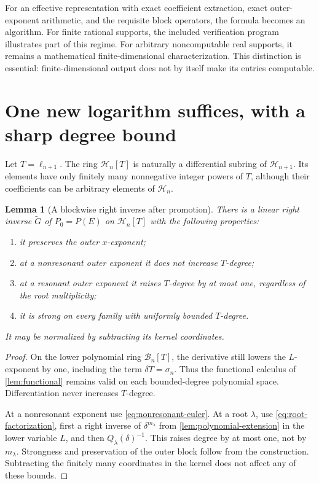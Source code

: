 \documentclass[11pt,a4paper]{article}
\numberwithin{equation}{section}
\newtheorem{lemma}[lemma]{Lemma}
\theoremstyle{definition}
\theoremstyle{remark}
\newcommand{\HH}{\mathcal H}
\begin{document}
For an effective representation with exact coefficient extraction, exact outer-exponent arithmetic, and the requisite block operators, the formula becomes an algorithm. For finite rational supports, the included verification program illustrates part of this regime. For arbitrary noncomputable real supports, it remains a mathematical finite-dimensional characterization. This distinction is essential: finite-dimensional output does not by itself make its entries computable.

\section{One new logarithm suffices, with a sharp degree bound}
\label{sec:promotion}
Let $T=\ell_{n+1}$. The ring $\HH_n[T]$ is naturally a differential subring of $\HH_{n+1}$. Its elements have only finitely many nonnegative integer powers of $T$, although their coefficients can be arbitrary elements of $\HH_n$.

\begin{lemma}[A blockwise right inverse after promotion]
\label{lem:promoted-inverse}
There is a linear right inverse $\widetilde G$ of $P_0=P(E)$ on $\HH_n[T]$ with the following properties:
\begin{enumerate}[label=(\alph*),leftmargin=2em,itemsep=2pt]
\item it preserves the outer $x$-exponent;
\item at a nonresonant outer exponent it does not increase $T$-degree;
\item at a resonant outer exponent it raises $T$-degree by at most one, regardless of the root multiplicity;
\item it is strong on every family with uniformly bounded $T$-degree.
\end{enumerate}
It may be normalized by subtracting its kernel coordinates.
\end{lemma}
\begin{proof}
On the lower polynomial ring $\mathcal B_n[T]$, the derivative still lowers the $L$-exponent by one, including the term $\delta T=\sigma_n$. Thus the functional calculus of \cref{lem:functional} remains valid on each bounded-degree polynomial space. Differentiation never increases $T$-degree.

At a nonresonant exponent use \eqref{eq:nonresonant-euler}. At a root $\lambda$, use \eqref{eq:root-factorization}, first a right inverse of $\delta^{m_\lambda}$ from \cref{lem:polynomial-extension} in the lower variable $L$, and then $Q_\lambda(\delta)^{-1}$. This raises degree by at most one, not by $m_\lambda$. Strongness and preservation of the outer block follow from the construction. Subtracting the finitely many coordinates in the kernel does not affect any of these bounds.
\end{proof}
\end{document}
